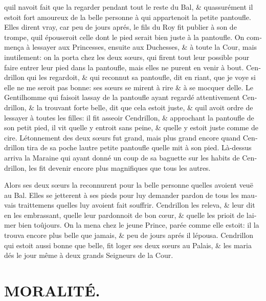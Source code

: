 \documentclass[14pt,a4paper]{memoir}
\begin{document}
\begin{otherlanguage}{french}
qu\textquotesingle il n\textquotesingle avoit fait que la regarder
pendant tout le reste du Bal, \& qu\textquotesingle assurément il estoit
fort amoureux de la belle personne à qui appartenoit la petite
pantoufle. Elles dirent vray, car peu de jours aprés, le fils du Roy fit
publier à son de trompe, qu\textquotesingle il épouseroit celle dont le
pied serait bien juste à la pantoufle. On commença à
l\textquotesingle essayer aux Princesses, ensuite aux Duchesses, \& à
toute la Cour, mais inutilement: on la porta chez les deux sœurs, qui
firent tout leur possible pour faire entrer leur pied dans la pantoufle,
mais elles ne purent en venir à bout. Cendrillon qui les regardoit, \&
qui reconnut sa pantoufle, dit en riant, que je voye si elle ne me
seroit pas bonne: ses sœurs se mirent à rire \& à se mocquer
d\textquotesingle elle. Le Gentilhomme qui faisoit
l\textquotesingle assay de la pantoufle ayant regardé attentivement
Cendrillon, \& la trouvant forte belle, dit que cela estoit juste, \&
qu\textquotesingle il avoit ordre de l\textquotesingle essayer à toutes
les filles: il fit asseoir Cendrillon, \& approchant la pantoufle de son
petit pied, il vit qu\textquotesingle elle y entroit sans peine, \&
qu\textquotesingle elle y estoit juste comme de cire.
L\textquotesingle étonnement des deux sœurs fut grand, mais plus grand
encore quand Cendrillon tira de sa poche l\textquotesingle autre petite
pantoufle qu\textquotesingle elle mit à son pied. Là-dessus arriva la
Maraine qui ayant donné un coup de sa baguette sur les habits de
Cendrillon, les fit devenir encore plus magnifiques que tous les autres.

Alors ses deux sœurs la reconnurent pour la belle personne
qu\textquotesingle elles avoient veuë au Bal. Elles se jetterent à ses
pieds pour luy demander pardon de tous les mauvais traittemens
qu\textquotesingle elles luy avoient fait souffrir. Cendrillon les
releva, \& leur dit en les embrassant, qu\textquotesingle elle leur
pardonnoit de bon cœur, \& qu\textquotesingle elle les prioit de
l\textquotesingle aimer bien toûjours. On la mena chez le jeune Prince,
parée comme elle estoit: il la trouva encore plus belle que jamais, \&
peu de jours aprés il l\textquotesingle épousa. Cendrillon qui estoit
aussi bonne que belle, fit loger ses deux sœurs au Palais, \& les maria
dés le jour même à deux grands Seigneurs de la Cour.

\section{MORALITÉ.}


\end{otherlanguage}
\end{document}
